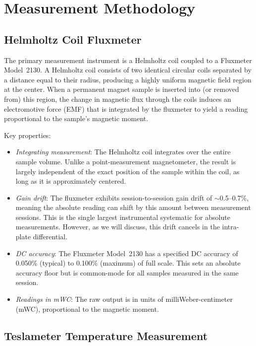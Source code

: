 \documentclass[11pt,letterpaper]{article}
\begin{document}
\section{Measurement Methodology}
\label{sec:measurement}

\subsection{Helmholtz Coil Fluxmeter}

The primary measurement instrument is a Helmholtz coil coupled to a Fluxmeter
Model~2130. A Helmholtz coil consists of two identical circular coils separated
by a distance equal to their radius, producing a highly uniform magnetic field
region at the center. When a permanent magnet sample is inserted into (or
removed from) this region, the change in magnetic flux through the coils
induces an electromotive force (EMF) that is integrated by the fluxmeter to
yield a reading proportional to the sample's magnetic moment.

Key properties:
\begin{itemize}
    \item \emph{Integrating measurement}: The Helmholtz coil integrates over
    the entire sample volume. Unlike a point-measurement magnetometer, the
    result is largely independent of the exact position of the sample within
    the coil, as long as it is approximately centered.
    \item \emph{Gain drift}: The fluxmeter exhibits session-to-session gain
    drift of $\sim$0.5--0.7\%, meaning the absolute reading can shift by this
    amount between measurement sessions. This is the single largest
    instrumental systematic for absolute measurements. However, as we will
    discuss, this drift cancels in the intra-plate differential.
    \item \emph{DC accuracy}: The Fluxmeter Model~2130 has a specified DC
    accuracy of 0.050\% (typical) to 0.100\% (maximum) of full scale. This
    sets an absolute accuracy floor but is common-mode for all samples
    measured in the same session.
    \item \emph{Readings in mWC}: The raw output is in units of
    milliWeber-centimeter (mWC), proportional to the magnetic moment.
\end{itemize}

\subsection{Teslameter Temperature Measurement}
\end{document}
